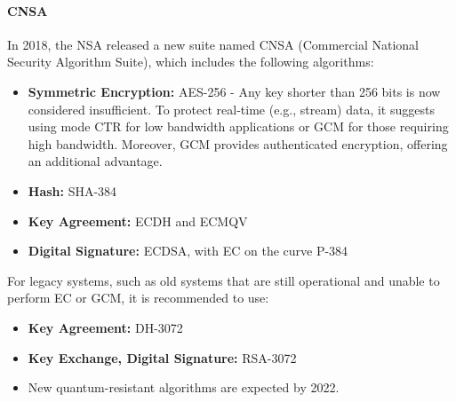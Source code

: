 \paragraph*{CNSA}
In 2018, the NSA released a new suite named CNSA (Commercial National Security Algorithm Suite), which includes the following algorithms:
\begin{itemize}
    \item \textbf{Symmetric Encryption:} AES-256 - Any key shorter than 256 bits is now considered insufficient. To protect real-time (e.g., stream) data, it suggests using mode CTR for low bandwidth applications or GCM for those requiring high bandwidth. Moreover, GCM provides authenticated encryption, offering an additional advantage.
    \item \textbf{Hash:} SHA-384
    \item \textbf{Key Agreement:} ECDH and ECMQV
    \item \textbf{Digital Signature:} ECDSA, with EC on the curve P-384
\end{itemize}
For legacy systems, such as old systems that are still operational and unable to perform EC or GCM, it is recommended to use:
\begin{itemize}
    \item \textbf{Key Agreement:} DH-3072
    \item \textbf{Key Exchange, Digital Signature:} RSA-3072
    \item New quantum-resistant algorithms are expected by 2022.
\end{itemize}

